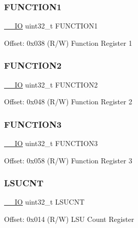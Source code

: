 \subsubsection{\texorpdfstring{FUNCTION1}{FUNCTION1}}
{\footnotesize\ttfamily \mbox{\hyperlink{core__sc300_8h_aec43007d9998a0a0e01faede4133d6be}{\+\_\+\+\_\+\+IO}} uint32\+\_\+t F\+U\+N\+C\+T\+I\+O\+N1}

Offset\+: 0x038 (R/W) Function Register 1 \mbox{\label{struct_d_w_t___type_a93d1f9f928292854f16333500e554c41}} 
\subsubsection{\texorpdfstring{FUNCTION2}{FUNCTION2}}
{\footnotesize\ttfamily \mbox{\hyperlink{core__sc300_8h_aec43007d9998a0a0e01faede4133d6be}{\+\_\+\+\_\+\+IO}} uint32\+\_\+t F\+U\+N\+C\+T\+I\+O\+N2}

Offset\+: 0x048 (R/W) Function Register 2 \mbox{\label{struct_d_w_t___type_ad3bf90012b7b60cd030c54ed0ec0442d}} 
\subsubsection{\texorpdfstring{FUNCTION3}{FUNCTION3}}
{\footnotesize\ttfamily \mbox{\hyperlink{core__sc300_8h_aec43007d9998a0a0e01faede4133d6be}{\+\_\+\+\_\+\+IO}} uint32\+\_\+t F\+U\+N\+C\+T\+I\+O\+N3}

Offset\+: 0x058 (R/W) Function Register 3 \mbox{\label{struct_d_w_t___type_ab1d62b8e1a69bead9717d5a02f741811}} 
\subsubsection{\texorpdfstring{LSUCNT}{LSUCNT}}
{\footnotesize\ttfamily \mbox{\hyperlink{core__sc300_8h_aec43007d9998a0a0e01faede4133d6be}{\+\_\+\+\_\+\+IO}} uint32\+\_\+t L\+S\+U\+C\+NT}

Offset\+: 0x014 (R/W) L\+SU Count Register \mbox{\label{struct_d_w_t___type_ab3f06e2cb3a76edc6f3fc90af88671ba}} 
